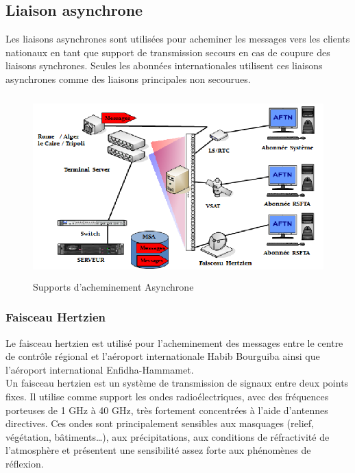 \subsection{Liaison asynchrone}

Les liaisons asynchrones sont utilisées  pour acheminer les messages vers les clients nationaux en tant que support de transmission secours en cas de coupure des liaisons synchrones. Seules les abonnées internationales utilisent ces liaisons asynchrones comme des liaisons principales non secourues. \\

\begin{figure}[!h]
\begin{center}
\includegraphics[width=14cm,height=7cm]{existant/asyn.png}
\end{center}
\caption{Supports d’acheminement Asynchrone}
\end{figure}
\subsubsection{Faisceau Hertzien}

Le faisceau hertzien est utilisé pour l’acheminement des messages entre le centre de contrôle régional et l’aéroport internationale Habib Bourguiba ainsi que l’aéroport international Enfidha-Hammamet.\\

Un faisceau hertzien est un système de transmission de signaux  entre deux points fixes. Il utilise comme support les ondes radioélectriques, avec des fréquences porteuses de 1 GHz à 40 GHz, très fortement concentrées à l'aide d'antennes directives. Ces ondes sont principalement sensibles aux masquages (relief, végétation, bâtiments…), aux précipitations, aux conditions de réfractivité de l'atmosphère et présentent une sensibilité assez forte aux phénomènes de réflexion\cite{cite4}. \\

